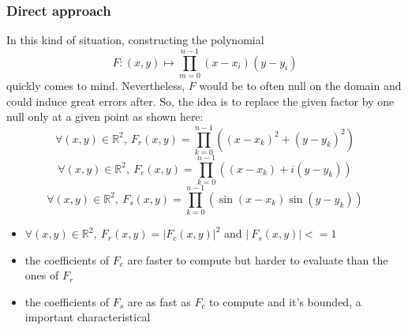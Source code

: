 \subsubsection{Direct approach}
In this kind of situation, constructing the polynomial $$F:(x,y)\mapsto\prod_{m=0}^{n-1}(x-x_i)(y-y_i)$$ quickly comes to mind. Nevertheless, $F$ would be to often null on the domain and could induce great errors after. So, the idea is to replace the given factor by one null only at a given point as shown here:
$$\forall (x,y)\in\mathbb{R}^2,~F_r(x,y) = \prod_{k=0}^{n-1}((x-x_k)^2 + (y-y_k)^2)$$
\newline
$$\forall (x,y)\in\mathbb{R}^2,~F_c(x,y) = \prod_{k=0}^{n-1}((x-x_k) + i(y-y_k))$$
\newline
$$\forall (x,y)\in\mathbb{R}^2,~F_s(x,y) = \prod_{k=0}^{n-1}(\sin(x-x_k)\sin(y-y_k))$$

\begin{itemize}
    \item $\forall (x,y)\in\mathbb{R}^2,~F_r(x,y)=\vert F_c(x,y) \vert^2$ and $|~F_s(x,y)|<=1$
    \item the coefficients of $F_c$ are faster to compute but harder to evaluate than the ones of $F_r$
    \item the coefficients of $F_s$ are as fast as $F_c$ to compute and it's bounded, a important characteristical 
\end{itemize}

